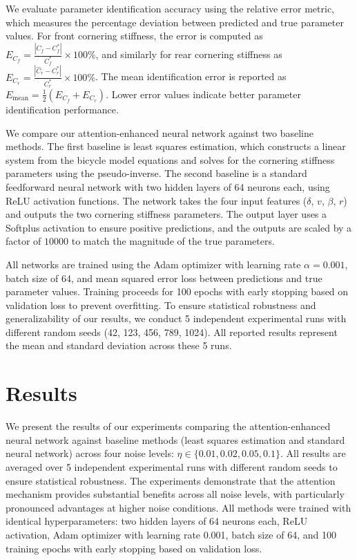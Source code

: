 \documentclass[Afour,sageh,times]{sagej}
\begin{document}
We evaluate parameter identification accuracy using the relative error metric, which measures the percentage deviation between predicted and true parameter values. For front cornering stiffness, the error is computed as $E_{C_f} = \frac{|\hat{C}_f - C_f^*|}{C_f^*} \times 100\%$, and similarly for rear cornering stiffness as $E_{C_r} = \frac{|\hat{C}_r - C_r^*|}{C_r^*} \times 100\%$. The mean identification error is reported as $E_{\text{mean}} = \frac{1}{2}(E_{C_f} + E_{C_r})$. Lower error values indicate better parameter identification performance.

We compare our attention-enhanced neural network against two baseline methods. The first baseline is least squares estimation, which constructs a linear system from the bicycle model equations and solves for the cornering stiffness parameters using the pseudo-inverse. The second baseline is a standard feedforward neural network with two hidden layers of 64 neurons each, using ReLU activation functions. The network takes the four input features ($\delta$, $v$, $\beta$, $r$) and outputs the two cornering stiffness parameters. The output layer uses a Softplus activation to ensure positive predictions, and the outputs are scaled by a factor of $10000$ to match the magnitude of the true parameters.

All networks are trained using the Adam optimizer with learning rate $\alpha = 0.001$, batch size of 64, and mean squared error loss between predictions and true parameter values. Training proceeds for 100 epochs with early stopping based on validation loss to prevent overfitting. To ensure statistical robustness and generalizability of our results, we conduct 5 independent experimental runs with different random seeds (42, 123, 456, 789, 1024). All reported results represent the mean and standard deviation across these 5 runs.

\section{Results}
\label{sec:results}

We present the results of our experiments comparing the attention-enhanced neural network against baseline methods (least squares estimation and standard neural network) across four noise levels: $\eta \in \{0.01, 0.02, 0.05, 0.1\}$. All results are averaged over 5 independent experimental runs with different random seeds to ensure statistical robustness. The experiments demonstrate that the attention mechanism provides substantial benefits across all noise levels, with particularly pronounced advantages at higher noise conditions. All methods were trained with identical hyperparameters: two hidden layers of 64 neurons each, ReLU activation, Adam optimizer with learning rate 0.001, batch size of 64, and 100 training epochs with early stopping based on validation loss.
\end{document}
